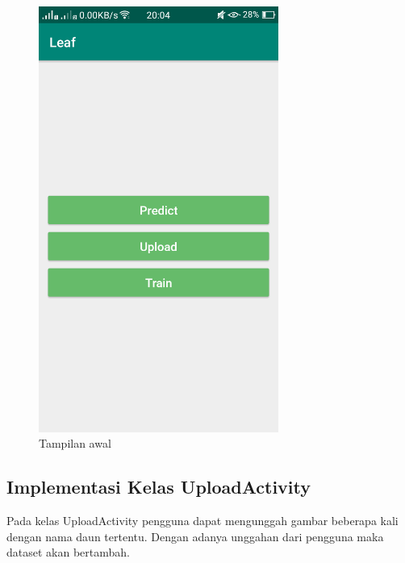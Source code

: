 \begin{figure}[H]
	\centering\includegraphics[width=0.7\textwidth]{bab4/figures/main.png}
	\caption{Tampilan awal}
	\label{fig:main}
\end{figure}
\subsection{Implementasi Kelas UploadActivity}
\par Pada kelas UploadActivity pengguna dapat mengunggah gambar beberapa kali dengan nama daun tertentu. Dengan adanya unggahan dari pengguna maka dataset akan bertambah.

